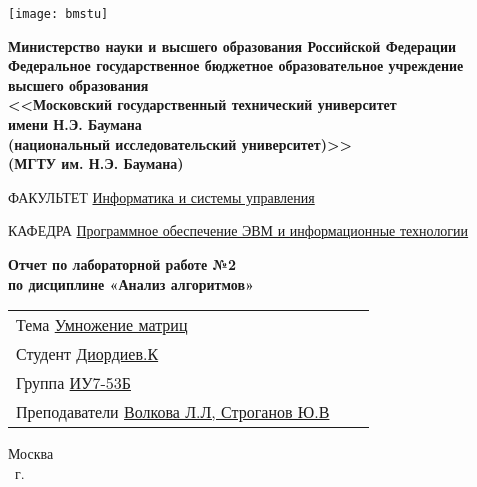     \thispagestyle{empty}

    \noindent\begin{minipage}{0.05\textwidth}
        \texttt{[image: bmstu]}
    \end{minipage}
    \hfill
    \begin{minipage}{0.85\textwidth}\raggedleft
        \begin{center}
            \fontsize{10pt}{0.3\baselineskip}\selectfont \textbf{Министерство науки и высшего образования Российской Федерации \\ Федеральное государственное бюджетное образовательное учреждение \\ высшего образования \\ <<Московский государственный технический университет \\ имени Н.Э. Баумана \\ (национальный исследовательский университет)>> \\ (МГТУ им. Н.Э. Баумана)}
        \end{center}
    \end{minipage}

    \begin{center}
        \fontsize{12pt}{0.1\baselineskip}\selectfont
        \noindent\makebox[\linewidth]{\rule{\textwidth}{4pt}} \makebox[\linewidth]{\rule{\textwidth}{1pt}}
    \end{center}

    \begin{flushleft}
        \fontsize{12pt}{0.8\baselineskip}\selectfont

        ФАКУЛЬТЕТ \uline{
            \hfill
            Информатика и системы управления
            \hfill}

        КАФЕДРА \uline{\mbox{\hspace{4mm}}
            \hfill
            Программное обеспечение ЭВМ и информационные технологии
            \hfill}
    \end{flushleft}

    \vfill
    
    \begin{center}
        \fontsize{19pt}{\baselineskip}\selectfont

        \textbf{Отчет по лабораторной работе №2} \\
        \textbf{по дисциплине «Анализ алгоритмов»}
    \end{center}

    \vfill
    
    \begin{tabularx}{\textwidth}{Xcc}
        Тема \uline{Умножение матриц} \\
        Студент \uline{Диордиев.К} \\
        Группа \uline{ИУ7-53Б} \\
        Преподаватели \uline{Волкова Л.Л, Строганов Ю.В} \\
    \end{tabularx}
    
    \vfill
    
    \begin{center}
        \normalsize Москва \\
        \the\year ~г.
    \end{center}
